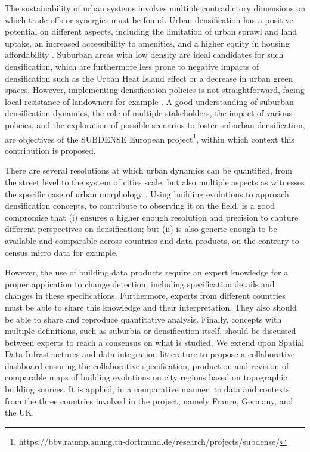 \documentclass[agile, final]{copernicus-agile}
\begin{document}
The sustainability of urban systems involves multiple contradictory dimensions on which trade-offs or synergies must be found. Urban densification has a positive potential on different aspects, including the limitation of urban sprawl and land uptake, an increased accessibility to amenities, and a higher equity in housing affordability \citep{jehling2020densification}. Suburban areas with low density are ideal candidates for such densification, which are furthermore less prone to negative impacts of densification such as the Urban Heat Island effect or a decrease in urban green spaces. However, implementing densification policies is not straightforward, facing local resistance of landowners for example \citep{dembski2021reurbanisation}. A good understanding of suburban densification dynamics, the role of multiple stakeholders, the impact of various policies, and the exploration of possible scenarios to foster suburban densification, are objectives of the SUBDENSE European project\footnote{https://bbv.raumplanung.tu-dortmund.de/research/projects/subdense/}, within which context this contribution is proposed.

There are several resolutions at which urban dynamics can be quantified, from the street level to the system of cities scale, but also multiple aspects as witnesses the specific case of urban morphology \citep{zhang2023spatial}. Using building evolutions  to approach densification concepts, to contribute to observing it on the field, is a good compromise that (i) ensures a higher enough resolution and precision to capture different perspectives on  densification; but (ii) is also generic enough to be available and comparable across countries and data products, on the contrary to census micro data for example.

However, the use of building data products require an expert knowledge for a proper application to change detection, including specification details and changes in these specifications. Furthermore, experts from different countries must be able to share this knowledge and their interpretation. They also should be able to share and reproduce quantitative analysis. Finally, concepts with multiple definitions, such as suburbia or densification itself, should be discussed between experts to reach a consensus on what is studied. We extend upon Spatial Data Infrastructures and data integration litterature to propose a collaborative dashboard ensuring the collaborative specification, production and revision of comparable maps of building evolutions on city regions based on topographic building sources.  It is applied, in a comparative manner, to data and contexts from the three countries involved in the project, namely France, Germany, and the UK.
\end{document}
